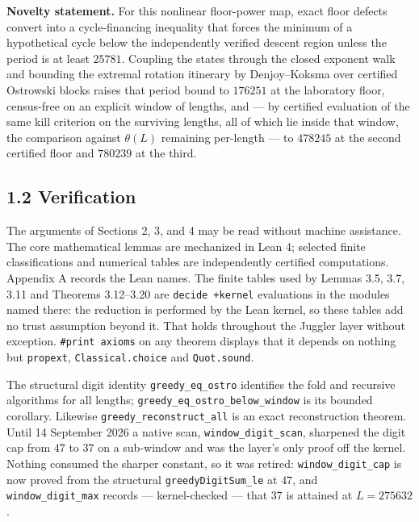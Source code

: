 \documentclass[12pt]{article}
\begin{document}
\textbf{Novelty statement.} For this nonlinear floor-power map, exact
floor defects convert into a cycle-financing inequality that forces the
minimum of a hypothetical cycle below the independently verified descent
region unless the period is at least \(25781\). Coupling the states
through the closed exponent walk and bounding the extremal rotation
itinerary by Denjoy--Koksma over certified Ostrowski blocks raises that
period bound to \(176251\) at the laboratory floor, census-free on an
explicit window of lengths, and --- by certified evaluation of the same
kill criterion on the surviving lengths, all of which lie inside that
window, the comparison against \(\theta(L)\) remaining per-length --- to
\(478245\) at the second certified floor and \(780239\) at the third.

\subsection{1.2 Verification}\label{verification}

The arguments of Sections 2, 3, and 4 may be read without machine
assistance. The core mathematical lemmas are mechanized in Lean 4;
selected finite classifications and numerical tables are independently
certified computations. Appendix A records the Lean names. The finite
tables used by Lemmas 3.5, 3.7, 3.11 and Theorems 3.12--3.20 are
\texttt{decide\ +kernel} evaluations in the modules named there: the
reduction is performed by the Lean kernel, so these tables add no trust
assumption beyond it. That holds throughout the Juggler layer without
exception. \texttt{\#print\ axioms} on any theorem displays that it
depends on nothing but \texttt{\nolinkurl{propext}},
\texttt{\nolinkurl{Classical.choice}} and
\texttt{\nolinkurl{Quot.sound}}.

The structural digit identity \texttt{\nolinkurl{greedy_eq_ostro}}
identifies the fold and recursive algorithms for all lengths;
\texttt{\nolinkurl{greedy_eq_ostro_below_window}} is its bounded
corollary. Likewise \texttt{\nolinkurl{greedy_reconstruct_all}} is an
exact reconstruction theorem. Until 14 September 2026 a native scan,
\texttt{\nolinkurl{window_digit_scan}}, sharpened the digit cap from
\(47\) to \(37\) on a sub-window and was the layer's only proof off the
kernel. Nothing consumed the sharper constant, so it was retired:
\texttt{\nolinkurl{window_digit_cap}} is now proved from the structural
\texttt{\nolinkurl{greedyDigitSum_le}} at \(47\), and
\texttt{\nolinkurl{window_digit_max}} records --- kernel-checked ---
that \(37\) is attained at \(L = 275632\).
\end{document}
